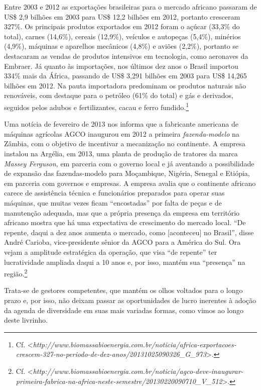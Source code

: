 Entre 2003 e 2012 as exportações brasileiras para o mercado africano
passaram de US\$ 2,9 bilhões em 2003 para US\$ 12,2 bilhões em 2012,
portanto cresceram 327\%. Os principais produtos exportados em 2012
foram o açúcar (33,3\% do total), carnes (14,6\%), cereais (12,9\%),
veículos e autopeças (5,4\%), minérios (4,9\%), máquinas e aparelhos
mecânicos (4,8\%) e aviões (2,2\%), portanto se destacaram as vendas de
produtos intensivos em tecnologia, como aeronaves da Embraer. Já quanto
às importações, nos últimos dez anos o Brasil importou 334\% mais da
África, passando de US\$ 3,291 bilhões em 2003 para US\$ 14,265 bilhões
em 2012. Na pauta importadora predominam os produtos naturais não
renováveis, com destaque para o petróleo (61\% do total) e gás e
derivados, seguidos pelos adubos e fertilizantes, cacau e ferro
fundido.\footnote{Cf.
  \textless{}\emph{http://www.biomassabioenergia.com.br/noticia/africa-exportacoes-crescem-327-no-periodo-de-dez-anos/20131025090326\_G\_973}\textgreater{}.}

Uma notícia de fevereiro de 2013 nos informa que a fabricante americana
de máquinas agrícolas AGCO inaugurou em 2012 a primeira
\emph{fazenda-modelo} na Zâmbia, com o objetivo de incentivar a
mecanização no continente. A empresa instalou na Argélia, em 2013, uma
planta de produção de tratores da marca \emph{Massey Ferguson}, em
parceria com o governo local e já aventando a possibilidade de expansão
das fazendas-modelo para Moçambique, Nigéria, Senegal e Etiópia, em
parceria com governos e empresas. A empresa avalia que o continente
africano carece de assistência técnica e funcionários preparados para
operar suas máquinas, que muitas vezes ficam ``encostadas'' por falta de
peças e de manutenção adequada, mas que a própria presença da empresa em
território africano mostra que há uma expectativa de crescimento do
mercado local. ``De repente, daqui a dez anos aumenta o mercado, como
{[}aconteceu{]} no Brasil'', disse André Carioba, vice-presidente sênior
da AGCO para a América do Sul. Ora vejam a amplitude estratégica da
operação, que visa ``de repente'' ter lucratividade ampliada daqui a 10
anos e, por isso, mantém sua ``presença'' na região.\footnote{Cf.
  \textless{}\emph{http://www.biomassabioenergia.com.br/noticia/agco-deve-inaugurar-primeira-fabrica-na-africa-neste-semestre/20130220090710\_V\_512}\textgreater{}.}

Trata-se de gestores competentes, que mantém os olhos voltados para o
longo prazo e, por isso, não deixam passar as oportunidades de lucro
inerentes à adoção da agenda de diversidade em suas mais variadas
formas, como vimos ao longo deste livrinho.

